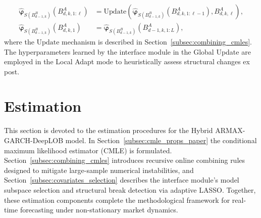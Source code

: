 \documentclass{rQUF2e}
\theoremstyle{plain}
\theoremstyle{definition}
\theoremstyle{remark}
\begin{document}
\begin{align*}
    \hat{\boldsymbol{\varphi}}_{S(B^B_{d-1,k})}\left(B^A_{d,k,1:\ell} \right) &= \mathrm{Update}\left(\hat{\boldsymbol{\varphi}}_{S(B^B_{d-1,k})}\left(B^A_{d,k,1:\ell-1} \right), B^A_{d,k,\ell}\right),\\
    \hat{\boldsymbol{\varphi}}_{S(B^B_{d-1,k})}\left(B^A_{d,k,1} \right) &= \hat{\boldsymbol{\varphi}}_{S(B^B_{d-1,k})}\left(B^A_{d - 1,k,1:L} \right),
\end{align*}
where the $\mathrm{Update}$ mechanism is described in Section~\ref{subsec:combining_cmles}. The hyperparameters learned by the interface module in the Global Update are employed in the Local Adapt mode to heuristically assess structural changes ex post.



\section{Estimation}
\label{Sect:Estimation}
This section is devoted to the estimation procedures for the Hybrid ARMAX-GARCH-DeepLOB model.  In Section~\ref{subsec:cmle_props_paper} the conditional maximum likelihood estimator (CMLE) is formulated.  Section~\ref{subsec:combining_cmles} introduces recursive online combining rules designed to mitigate large-sample numerical instabilities, and Section~\ref{subsec:covariates_selection} describes the interface module’s model subspace selection and structural break detection via adaptive LASSO.  Together, these estimation components complete the methodological framework for real-time forecasting under non-stationary market dynamics.
\end{document}
